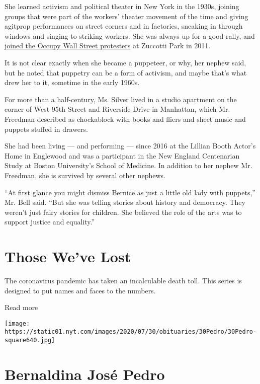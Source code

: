 She learned activism and political theater in New York in the 1930s,
joining groups that were part of the workers' theater movement of the
time and giving agitprop performances on street corners and in
factories, sneaking in through windows and singing to striking workers.
She was always up for a good rally, and
\href{https://www.youtube.com/watch?v=-gX8Hhraz8Q}{joined the Occupy
Wall Street protesters} at Zuccotti Park in 2011.

It is not clear exactly when she became a puppeteer, or why, her nephew
said, but he noted that puppetry can be a form of activism, and maybe
that's what drew her to it, sometime in the early 1960s.

For more than a half-century, Ms. Silver lived in a studio apartment on
the corner of West 95th Street and Riverside Drive in Manhattan, which
Mr. Freedman described as chockablock with books and fliers and sheet
music and puppets stuffed in drawers.

She had been living --- and performing --- since 2016 at the Lillian
Booth Actor's Home in Englewood and was a participant in the New England
Centenarian Study at Boston University's School of Medicine. In addition
to her nephew Mr. Freedman, she is survived by several other nephews.

``At first glance you might dismiss Bernice as just a little old lady
with puppets,'' Mr. Bell said. ``But she was telling stories about
history and democracy. They weren't just fairy stories for children. She
believed the role of the arts was to support justice and equality.''

\href{https://www.nytimes.com/interactive/2020/obituaries/people-died-coronavirus-obituaries.html?action=click\&pgtype=Article\&state=default\&region=BELOW_MAIN_CONTENT\&context=covid_obits_promo}{}

\hypertarget{those-weve-lost}{%
\section{Those We've Lost}\label{those-weve-lost}}

The coronavirus pandemic has taken an incalculable death toll. This
series is designed to put names and faces to the numbers.

Read more

\texttt{[image: https://static01.nyt.com/images/2020/07/30/obituaries/30Pedro/30Pedro-square640.jpg]}

\hypertarget{bernaldina-josuxe9-pedro}{%
\section{Bernaldina José Pedro}\label{bernaldina-josuxe9-pedro}}


